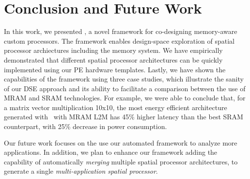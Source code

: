 \section{Conclusion and Future Work}
In this work, we presented \frameworkname, a novel framework for co-designing memory-aware custom processors.
The framework enables design-space exploration of spatial processor archiectures including the memory system. We have empirically demonstrated that different spatial processor architectures can be quickly implemented using our PE hardware templates. Lastly, we have shown the capabilities of the framework using three case studies, which illustrate the sanity of our DSE approach and its ability to facilitate a comparison between the use of MRAM and SRAM technologies.
For example, we were able to conclude that, for a matrix vector multiplication 10x10, the most energy efficient architecture generated with \frameworkname~with MRAM L2M has 45\% higher latency than the best SRAM counterpart, with 25\% decrease in power consumption.

Our future work focuses on the use our automated framework to analyze more applications. In addition, we plan to enhance our framework adding the capability of automatically \textit{merging} multiple spatial processor architectures, to generate a single \textit{multi-application spatial processor}.
